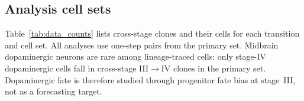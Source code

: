 \subsection{Analysis cell sets}
Table~\ref{tab:data_counts} lists cross-stage clones and their cells for each
transition and cell set. All analyses use one-step pairs from the primary set. Midbrain
dopaminergic neurons are rare among lineage-traced cells: only \nDACellsCrossStage{}
stage-IV dopaminergic cells fall in cross-stage III$\to$IV clones in the primary set.
Dopaminergic fate is therefore studied through progenitor fate bias at stage~III, not as
a forecasting target.



